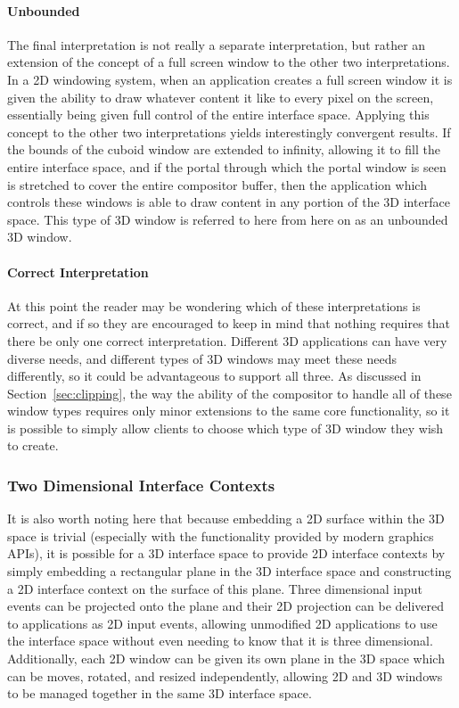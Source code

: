 \paragraph{Unbounded}

The final interpretation is not really a separate interpretation, but rather an extension of the concept of a full screen window to the other two interpretations. In a 2D windowing system, when an application creates a full screen window it is given the ability to draw whatever content it like to every pixel on the screen, essentially being given full control of the entire interface space. Applying this concept to the other two interpretations yields interestingly convergent results. If the bounds of the cuboid window are extended to infinity, allowing it to fill the entire interface space, and if the portal through which the portal window is seen is stretched to cover the entire compositor buffer, then the application which controls these windows is able to draw content in any portion of the 3D interface space. This type of 3D window is referred to here from here on as an unbounded 3D window.

\paragraph{Correct Interpretation}

At this point the reader may be wondering which of these interpretations is correct, and if so they are encouraged to keep in mind that nothing requires that there be only one correct interpretation. Different 3D applications can have very diverse needs, and different types of 3D windows may meet these needs differently, so it could be advantageous to support all three. As discussed in Section~\ref{sec:clipping}, the way the ability of the compositor to handle all of these window types requires only minor extensions to the same core functionality, so it is possible to simply allow clients to choose which type of 3D window they wish to create.
 
\subsubsection{Two Dimensional Interface Contexts}

It is also worth noting here that because embedding a 2D surface within the 3D space is trivial (especially with the functionality provided by modern graphics APIs), it is possible for a 3D interface space to provide 2D interface contexts by simply embedding a rectangular plane in the 3D interface space and constructing a 2D interface context on the surface of this plane. Three dimensional input events can be projected onto the plane and their 2D projection can be delivered to applications as 2D input events, allowing unmodified 2D applications to use the interface space without even needing to know that it is three dimensional. Additionally, each 2D window can be given its own plane in the 3D space which can be moves, rotated, and resized independently, allowing 2D and 3D windows to be managed together in the same 3D interface space.

